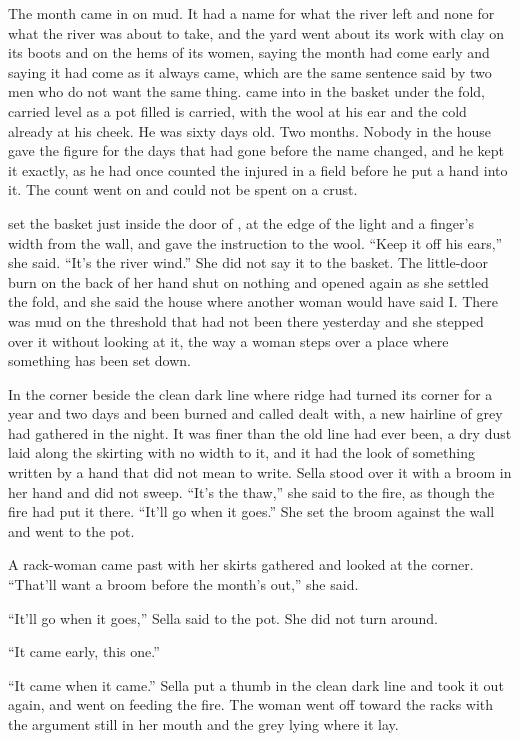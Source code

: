 
The month came in on mud. It had a name for what the river left and none for what the river was about to take, and the yard went about its work with clay on its boots and on the hems of its women, saying the month had come early and saying it had come as it always came, which are the same sentence said by two men who do not want the same thing.  came into  in the basket under the fold, carried level as a pot filled is carried, with the wool at his ear and the cold already at his cheek. He was sixty days old. Two months. Nobody in the house gave the figure for the days that had gone before the name changed, and he kept it exactly, as he had once counted the injured in a field before he put a hand into it. The count went on and could not be spent on a crust.

 set the basket just inside the door of , at the edge of the light and a finger's width from the wall, and gave the instruction to the wool. “Keep it off his ears,” she said. “It's the river wind.” She did not say it to the basket. The little-door burn on the back of her hand shut on nothing and opened again as she settled the fold, and she said the house where another woman would have said I. There was mud on the threshold that had not been there yesterday and she stepped over it without looking at it, the way a woman steps over a place where something has been set down.

In the corner beside the clean dark line where  ridge had turned its corner for a year and two days and been burned and called dealt with, a new hairline of grey had gathered in the night. It was finer than the old line had ever been, a dry dust laid along the skirting with no width to it, and it had the look of something written by a hand that did not mean to write. Sella stood over it with a broom in her hand and did not sweep. “It's the thaw,” she said to the fire, as though the fire had put it there. “It'll go when it goes.” She set the broom against the wall and went to the pot.

A rack-woman came past with her skirts gathered and looked at the corner. “That'll want a broom before the month's out,” she said.

“It'll go when it goes,” Sella said to the pot. She did not turn around.

“It came early, this one.”

“It came when it came.” Sella put a thumb in the clean dark line and took it out again, and went on feeding the fire. The woman went off toward the racks with the argument still in her mouth and the grey lying where it lay.

